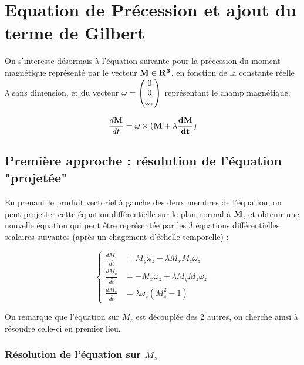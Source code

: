 \documentclass[12pt]{report}
\begin{document}
\chapter{Equation de Précession et ajout du terme de Gilbert}

On s'interesse désormais à l'équation suivante pour la précession du moment 
magnétique représenté par le vecteur $\bf{M} \in \mathbf{R}^3$, en fonction de la 
constante réelle $\lambda$ sans dimension, et du vecteur 
$\displaystyle{\bf{\omega} = \begin{pmatrix}
    0 \\
    0 \\
    \omega_z
  \end{pmatrix}}$
représentant le champ magnétique.

\begin{equation}
    \frac{d\bf{M}}{dt} = \bf{\omega} \times (\bf{M}+\lambda \frac{d\bf{M}}{dt})
    \label{eq:equation Gilbert}
\end{equation}


\section{Première approche : résolution de l'équation "projetée"}

En prenant le produit vectoriel à gauche des deux membres de l'équation, 
on peut projetter cette équation différentielle sur le plan normal à $\bf{M}$,
et obtenir une nouvelle équation qui  peut être représentée par les 3 
équations différentielles scalaires suivantes (après un chagement d'échelle temporelle) :

\begin{equation}
    \left\{
        \begin{aligned}
            \frac{dM_x}{d\tilde{t}} &= M_y\omega_z + \lambda M_x M_z \omega_z \\
            \frac{dM_y}{d\tilde{t}} &= -M_x\omega_z + \lambda M_y M_z \omega_z \\
            \frac{dM_z}{d\tilde{t}} &= \lambda\omega_z (M_z^2-1) 
        \end{aligned} 
    \right. 
    \label{eq:equations scalaires Gilbert}
\end{equation}

On remarque que l'équation sur $M_z$ est découplée des 2 autres, on cherche ainsi à résoudre
celle-ci en premier lieu.

\subsection{Résolution de l'équation sur $M_z$}
\end{document}
